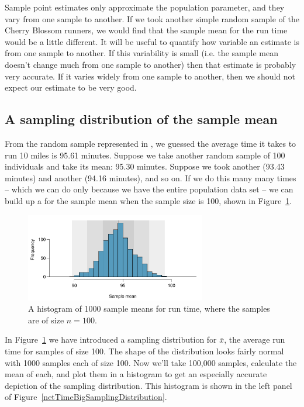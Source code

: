 Sample point estimates only approximate the population parameter, and they vary from one sample to another. If we took another simple random sample of the Cherry Blossom runners, we would find that the sample mean for the run time would be a little different. It will be useful to quantify how variable
an estimate is from one sample to another. If this variability is small (i.e. the sample mean doesn't change much from one sample to another) then that estimate is probably very accurate. If it varies widely from one sample to another, then we should not expect our estimate to be very good.






\subsection{A sampling distribution of the sample mean}

From the random sample represented in , we guessed the average time it takes to run 10 miles is 95.61 minutes. Suppose we take another random sample of 100 individuals and take its mean: 95.30 minutes. Suppose we took another (93.43 minutes) and another (94.16 minutes), and so on. If we do this many many times -- which we can do only because we have the entire population data set -- we can build up a  for the sample mean when the sample size is 100, shown in Figure~\ref{netTime1000SamplingDistribution}.

\begin{figure}[H]
   \centering
   \includegraphics[width=0.7\textwidth]{04-5/figures/netTime1000SamplingDistribution/netTime1000SamplingDistribution}
   \caption{A histogram of 1000 sample means for run time, where the samples are of size $n=100$.}
   \label{netTime1000SamplingDistribution}
\end{figure}


In Figure~\ref{netTime1000SamplingDistribution} we have introduced a sampling distribution for $\bar{x}$, the average run time for samples of size 100.
The shape of the distribution looks fairly normal with 1000 samples each of size 100.
Now we'll take 100,000 samples, calculate the mean of each, and plot them in a histogram to get an especially accurate depiction of the sampling distribution. This histogram is shown in the left panel of Figure~\ref{netTimeBigSamplingDistribution}.

